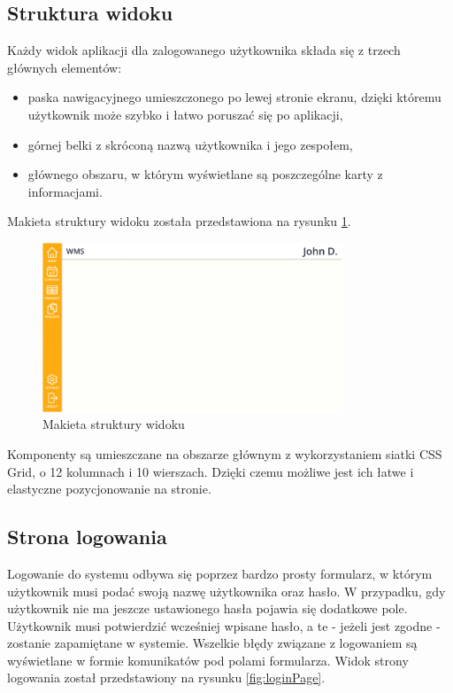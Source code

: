 \subsection{Struktura widoku}

Każdy widok aplikacji dla zalogowanego użytkownika składa się z trzech głównych elementów:
\begin{itemize}
    \item paska nawigacyjnego umieszczonego po lewej stronie ekranu, dzięki któremu użytkownik może szybko i łatwo poruszać się po aplikacji,
    \item górnej belki z skróconą nazwą użytkownika i jego zespołem,
    \item głównego obszaru, w którym wyświetlane są poszczególne karty z informacjami.
\end{itemize}

Makieta struktury widoku została przedstawiona na rysunku \ref{fig:layout}.

\begin{figure}[H]
    \centering
    \includegraphics[width=0.8\textwidth, frame]{graf/front/layoutMockup.png}
    \caption{Makieta struktury widoku}
    \label{fig:layout}
\end{figure}

Komponenty są umieszczane na obszarze głównym z wykorzystaniem siatki CSS Grid, o 12 kolumnach i 10 wierszach. Dzięki czemu możliwe jest ich łatwe i elastyczne pozycjonowanie na stronie.

\subsection{Strona logowania}

Logowanie do systemu odbywa się poprzez bardzo prosty formularz, w którym użytkownik musi podać swoją nazwę użytkownika oraz hasło. W przypadku, gdy użytkownik nie ma jeszcze ustawionego hasła pojawia się dodatkowe pole. Użytkownik musi potwierdzić wcześniej wpisane hasło, a te - jeżeli jest zgodne - zostanie zapamiętane w systemie. Wszelkie błędy związane z logowaniem są wyświetlane w formie komunikatów pod polami formularza.
Widok strony logowania został przedstawiony na rysunku \ref{fig:loginPage}.


